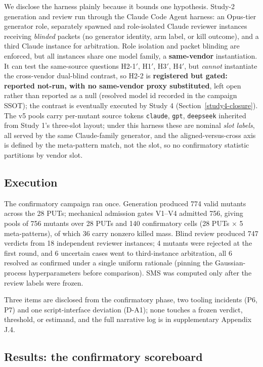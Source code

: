 \documentclass[manuscript,screen,review]{acmart}
\begin{document}
We disclose the harness plainly because it bounds one hypothesis. Study-2
generation and review run through the Claude Code Agent harness: an Opus-tier
generator role, separately spawned and role-isolated Claude reviewer instances
receiving \emph{blinded} packets (no generator identity, arm label, or
kill outcome), and a third Claude instance for arbitration. Role isolation and
packet blinding are enforced, but all instances share one model family, a
\textbf{same-vendor} instantiation. It can test the same-source questions
H2-1\('\), H1\('\), H3\('\), H4\('\), but \emph{cannot} instantiate the
cross-vendor dual-blind contrast, so H2-2 is \textbf{registered but gated:
reported not-run, with no same-vendor proxy substituted}, left open rather than
reported as a null (resolved model id recorded in the campaign SSOT); the
contrast is eventually executed by Study 4 (Section~\ref{study4-closure}). The v5
pools carry per-mutant source tokens \texttt{claude}, \texttt{gpt},
\texttt{deepseek} inherited from Study 1's three-slot layout; under this harness
these are nominal \emph{slot labels}, all served by the same Claude-family
generator, and the aligned-versus-cross axis is defined by the meta-pattern
match, not the slot, so no confirmatory statistic partitions by vendor slot.

\subsection{Execution}\label{study2-execution}

The confirmatory campaign ran once. Generation produced 774 valid
mutants across the 28 PUTs; mechanical admission gates V1--V4 admitted
756, giving pools of 756 mutants over 28 PUTs and 140 confirmatory cells
(28 PUTs \(\times\) 5 meta-patterns), of which 36 carry nonzero killed
mass. Blind review produced 747 verdicts from 18 independent reviewer
instances; 4 mutants were rejected at the first round, and 6 uncertain
cases went to third-instance arbitration, all 6 resolved as confirmed
under a single uniform rationale (pinning the Gaussian-process
hyperparameters before comparison). SMS was computed only after the
review labels were frozen.

Three items are disclosed from the confirmatory phase, two tooling incidents
(P6, P7) and one script-interface deviation (D-A1); none touches a frozen
verdict, threshold, or estimand, and the full narrative log is in
supplementary Appendix J.4.

\subsection{Results: the confirmatory scoreboard}\label{study2-scoreboard}
\end{document}
